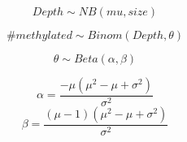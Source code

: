 \documentclass[a4paper]{article}
\begin{document}

\begin{equation*}
Depth \sim NB(mu, size)
\end{equation*}

\newpage
\begin{equation*}
\#methylated \sim Binom(Depth, \theta)
\end{equation*}

\newpage
\begin{equation*}
\theta \sim Beta(\alpha, \beta)
\end{equation*}


\newpage
\begin{equation*}
\alpha= \frac{-\mu \left( \mu^2  - \mu + \sigma^2 \right)}{\sigma^2}
\end{equation*}
\begin{equation*}
\beta= \frac{\left( \mu - 1 \right) \left( \mu^2 - \mu + \sigma^2 \right)}{ \sigma^2 }
\end{equation*}
\end{document}
